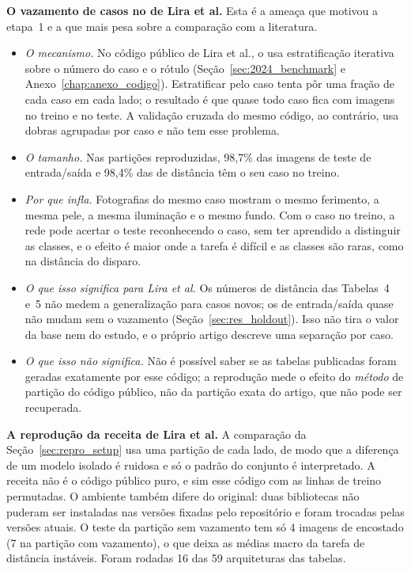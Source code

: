 \textbf{O vazamento de casos no  de Lira et al.} Esta é a ameaça que motivou a etapa~1 e a que mais pesa sobre a comparação com a literatura.
\begin{itemize}
    \item \emph{O mecanismo.} No código público de Lira et al., o  usa estratificação iterativa sobre o número do caso e o rótulo (Seção~\ref{sec:2024_benchmark} e Anexo~\ref{chap:anexo_codigo}). Estratificar pelo caso tenta pôr uma fração de cada caso em cada lado; o resultado é que quase todo caso fica com imagens no treino e no teste. A validação cruzada do mesmo código, ao contrário, usa dobras agrupadas por caso e não tem esse problema.
    \item \emph{O tamanho.} Nas partições reproduzidas, 98,7\% das imagens de teste de entrada/saída e 98,4\% das de distância têm o seu caso no treino.
    \item \emph{Por que infla.} Fotografias do mesmo caso mostram o mesmo ferimento, a mesma pele, a mesma iluminação e o mesmo fundo. Com o caso no treino, a rede pode acertar o teste reconhecendo o caso, sem ter aprendido a distinguir as classes, e o efeito é maior onde a tarefa é difícil e as classes são raras, como na distância do disparo.
    \item \emph{O que isso significa para Lira et al.} Os números de distância das Tabelas~4 e~5 não medem a generalização para casos novos; os de entrada/saída quase não mudam sem o vazamento (Seção~\ref{sec:res_holdout}). Isso não tira o valor da base nem do estudo, e o próprio artigo descreve uma separação por caso.
    \item \emph{O que isso não significa.} Não é possível saber se as tabelas publicadas foram geradas exatamente por esse código; a reprodução mede o efeito do \emph{método} de partição do código público, não da partição exata do artigo, que não pode ser recuperada.
\end{itemize}

\textbf{A reprodução da receita de Lira et al.} A comparação da Seção~\ref{sec:repro_setup} usa uma partição de cada lado, de modo que a diferença de um modelo isolado é ruidosa e só o padrão do conjunto é interpretado. A receita não é o código público puro, e sim esse código com as linhas de treino permutadas. O ambiente também difere do original: duas bibliotecas não puderam ser instaladas nas versões fixadas pelo repositório e foram trocadas pelas versões atuais. O teste da partição sem vazamento tem só 4 imagens de encostado (7 na partição com vazamento), o que deixa as médias macro da tarefa de distância instáveis. Foram rodadas 16 das 59 arquiteturas das tabelas.

